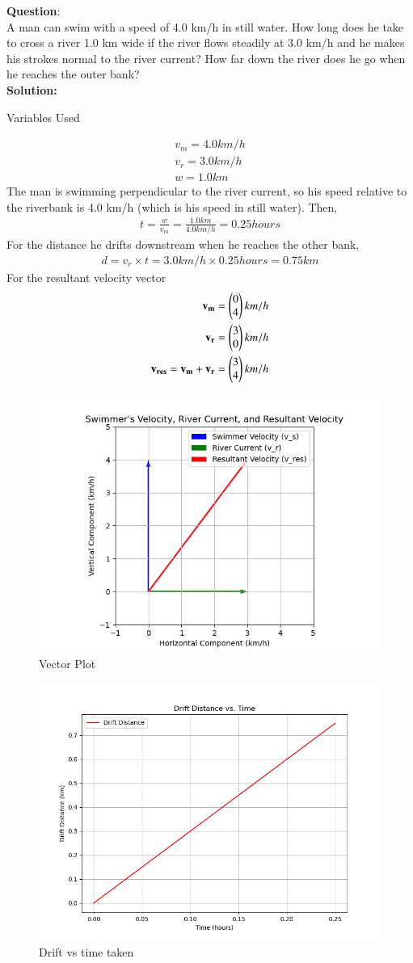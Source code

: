 \documentclass[journal]{IEEEtran}
\begin{document}
\textbf{Question}:\\
A man can swim with a speed of 4.0 km/h in still water. How long does he take to cross a river 1.0 km wide if the river flows steadily at 3.0 km/h and he makes his strokes normal to the river current? How far down the river does he go when he reaches the outer bank? \\
\textbf{Solution: }
\begin{table}[h!]    
  \centering
  
  \caption{Variables Used}
  \label{tab 1.2.26.1}
\end{table}
\begin{align}
	v_{m} = 4.0 km/h \\
	v_{r} = 3.0 km/h \\
	w = 1.0 km
\end{align}
The man is swimming perpendicular to the river current, so his speed relative to the riverbank is 4.0 km/h (which is his speed in still water). Then,
\begin{align}
	t = \frac{w}{v_{m}} = \frac{1.0 km}{4.0 km/h} = 0.25 hours
\end{align}
For the distance he drifts downstream when he reaches the other bank,
\begin{align}
	d = v_{r} \times t = 3.0 km/h \times 0.25 hours = 0.75 km
\end{align}
For the resultant velocity vector
\begin{align}
	\mathbf{v_{m}}=\begin{pmatrix}0 \\ 4\end{pmatrix} km/h \\
	\mathbf{v_{r}}=\begin{pmatrix}3 \\ 0\end{pmatrix} km/h \\
	\mathbf{v_{res}}=\mathbf{v_{m}}+\mathbf{v_{r}}=\begin{pmatrix} 3 \\ 4\end{pmatrix} km/h
\end{align}
\begin{figure}[h!]
   \centering
   \includegraphics[width=0.7\linewidth]{figures/Figure_1.png}
   \caption{Vector Plot}
   \label{vector}
\end{figure}
\begin{figure}[h!]
   \centering
   \includegraphics[width=0.7\linewidth]{figures/Figure_2.png}
   \caption{Drift vs time taken}
   \label{graph}
\end{figure}
\end{document}
